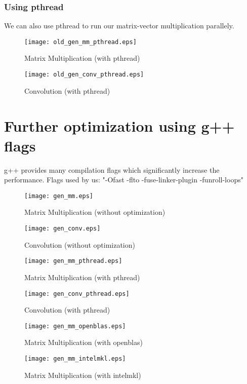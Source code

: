 \documentclass{article}
\begin{document}
    \newpage
    \subsubsection{Using pthread}
    We can also use pthread to run our matrix-vector multiplication parallely.
    \begin{figure}[!htb]
    \centering
        \texttt{[image: old\_gen\_mm\_pthread.eps]}
        \caption{Matrix Multiplication (with pthread)}
    \end{figure}
    \begin{figure}[!htb]
    \centering
        \texttt{[image: old\_gen\_conv\_pthread.eps]}
        \caption{Convolution (with pthread)}
    \end{figure}

    \newpage
    \section{Further optimization using g++ flags}
    g++ provides many compilation flags which significantly increase the performance.
    Flags used by us: "-Ofast -flto -fuse-linker-plugin -funroll-loops"

    \begin{figure}[!htb]
    \centering
        \texttt{[image: gen\_mm.eps]}
        \caption{Matrix Multiplication (without optimization)}
    \end{figure}
    \begin{figure}[!htb]
    \centering
        \texttt{[image: gen\_conv.eps]}
        \caption{Convolution (without optimization)}
    \end{figure}
    \begin{figure}[!htb]
    \centering
        \texttt{[image: gen\_mm\_pthread.eps]}
        \caption{Matrix Multiplication (with pthread)}
    \end{figure}
    \begin{figure}[!htb]
    \centering
        \texttt{[image: gen\_conv\_pthread.eps]}
        \caption{Convolution (with pthread)}
    \end{figure}
    \begin{figure}[!htb]
    \centering
        \texttt{[image: gen\_mm\_openblas.eps]}
        \caption{Matrix Multiplication (with openblas)}
    \end{figure}
    \begin{figure}[!htb]
    \centering
        \texttt{[image: gen\_mm\_intelmkl.eps]}
        \caption{Matrix Multiplication (with intelmkl)}
    \end{figure}

    \clearpage
    
    
\end{document}
